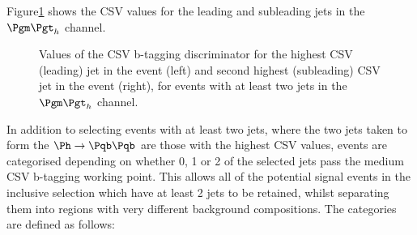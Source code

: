Figure\ref{fig:Hhhcsv} shows the \ac{CSV} values for the leading and subleading
jets in the $\mutau$ channel.

\begin{figure}
\begin{center}

\end{center}
\caption{
Values of the \ac{CSV} b-tagging discriminator for the highest \ac{CSV}
(leading) jet in the event (left) and second highest (subleading) \ac{CSV} jet
in the event (right), for events with at least two jets in the $\mutau$ channel.}
\label{fig:Hhhcsv}
\end{figure} 

In addition to selecting events with at least two jets, where the two jets taken
to form the $\Ph\to\Pqb\Pqb$ are those with the highest \ac{CSV} values, events
are categorised depending on whether 0, 1 or 2 of the selected jets pass the
medium \ac{CSV} b-tagging working point. This allows all of the potential signal
events in the inclusive selection which have at least 2 jets to be retained,
whilst separating them into regions with very different background compositions.
The categories are defined as follows:

